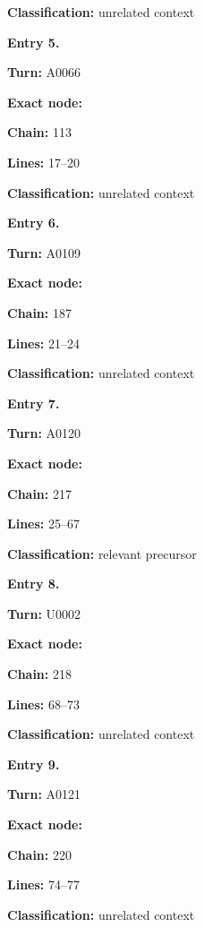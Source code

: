 \textbf{Classification:} unrelated context


\textbf{Entry 5.}

\textbf{Turn:} A0066

\textbf{Exact node:} \protect{}

\textbf{Chain:} 113

\textbf{Lines:} 17--20

\textbf{Classification:} unrelated context


\textbf{Entry 6.}

\textbf{Turn:} A0109

\textbf{Exact node:} \protect{}

\textbf{Chain:} 187

\textbf{Lines:} 21--24

\textbf{Classification:} unrelated context


\textbf{Entry 7.}

\textbf{Turn:} A0120

\textbf{Exact node:} \protect{}

\textbf{Chain:} 217

\textbf{Lines:} 25--67

\textbf{Classification:} relevant precursor


\textbf{Entry 8.}

\textbf{Turn:} U0002

\textbf{Exact node:} \protect{}

\textbf{Chain:} 218

\textbf{Lines:} 68--73

\textbf{Classification:} unrelated context


\textbf{Entry 9.}

\textbf{Turn:} A0121

\textbf{Exact node:} \protect{}

\textbf{Chain:} 220

\textbf{Lines:} 74--77

\textbf{Classification:} unrelated context


